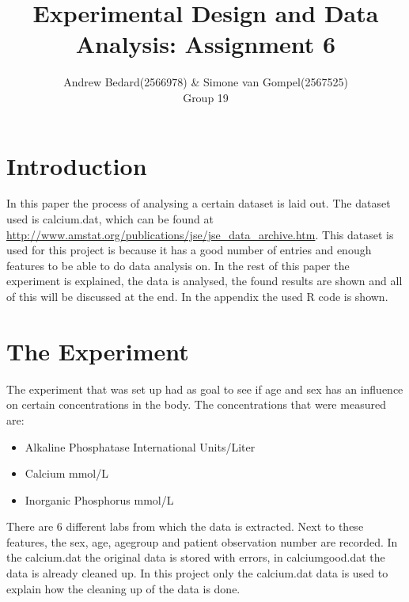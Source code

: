 \documentclass{article}
\title{Experimental Design and Data Analysis: Assignment 6}
\author{Andrew Bedard(2566978) \& Simone van Gompel(2567525) \\ Group 19}
\begin{document}
  \maketitle

  \section{Introduction}
    In this paper the process of analysing a certain dataset is laid out.
    The dataset used is calcium.dat, which can be found at \url{http://www.amstat.org/publications/jse/jse_data_archive.htm}.
    This dataset is used for this project is because it has a good number of entries and enough features to be able to do data analysis on.
    In the rest of this paper the experiment is explained, the data is analysed, the found results are shown and all of this will be discussed at the end.
    In the appendix the used R code is shown.

  \section{The Experiment}
    The experiment that was set up had as goal to see if age and sex has an influence on certain concentrations in the body.
    The concentrations that were measured are:
    \begin{itemize}
      \item Alkaline Phosphatase International Units/Liter
      \item Calcium mmol/L 
      \item Inorganic Phosphorus mmol/L
    \end{itemize}
    There are 6 different labs from which the data is extracted.
    Next to these features, the sex, age, agegroup and patient observation number are recorded.
    In the calcium.dat the original data is stored with errors, in calciumgood.dat the data is already cleaned up.
    In this project only the calcium.dat data is used to explain how the cleaning up of the data is done.
\end{document}
